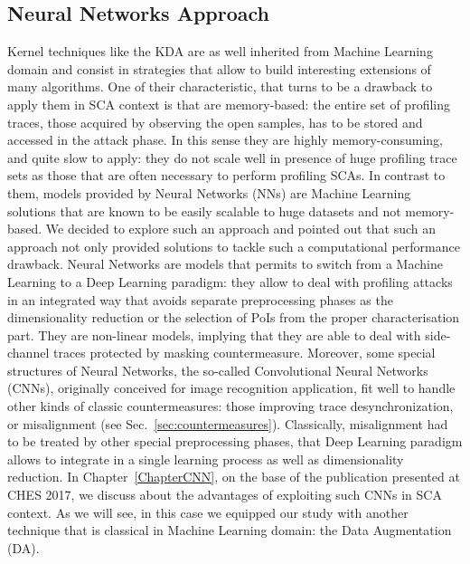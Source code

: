 \subsection{Neural Networks Approach}
Kernel techniques like the KDA  are as well inherited from Machine Learning domain and consist in strategies that allow to build interesting extensions of many algorithms. One of their characteristic, that turns to be a drawback to apply them in SCA context is that are memory-based: the entire set of profiling traces, \ie those acquired by observing the open samples, has to be stored and accessed in the attack phase. In this sense they are highly memory-consuming, and quite slow to apply: they do not scale well in presence of huge profiling trace sets as those that are often necessary to perform profiling SCAs. In contrast to them, models provided by Neural Networks (NNs) are Machine Learning solutions that are known to be easily scalable to huge datasets and not memory-based. We decided to explore such an approach and pointed out that such an approach not only provided solutions to tackle such a computational performance drawback. Neural Networks are models that permits to switch from a Machine Learning to a Deep Learning paradigm: they allow to deal with profiling attacks in an integrated way that avoids separate preprocessing phases as the dimensionality reduction or the selection of PoIs from the proper characterisation part. They are non-linear models, implying that they are able to deal with side-channel traces protected by masking countermeasure. Moreover, some special structures of Neural Networks, the so-called Convolutional Neural Networks (CNNs), originally conceived for image recognition application, fit well to handle other kinds of classic countermeasures: those improving trace desynchronization, or misalignment (see Sec.~\ref{sec:countermeasures}). Classically, misalignment had to be treated by other special preprocessing phases, that Deep Learning paradigm allows to integrate in a single learning process as well as dimensionality reduction. In Chapter~\ref{ChapterCNN}, on the base of the publication presented at CHES 2017, we discuss about the advantages of exploiting such CNNs in SCA context. As we will see, in this case we equipped our study with another technique that is classical in Machine Learning domain: the Data Augmentation (DA). 

